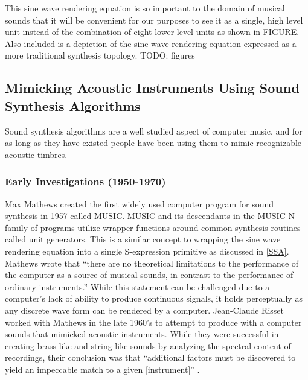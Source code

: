 \documentclass[12pt]{article}
\begin{document}
This sine wave rendering equation is so important to the domain of musical sounds that it will be convenient for our purposes to see it as a single, high level unit instead of the combination of eight lower level units as shown in FIGURE. Also included is a depiction of the sine wave rendering equation expressed as a more traditional synthesis topology. TODO: figures
	
\subsection{Mimicking Acoustic Instruments Using Sound Synthesis Algorithms}
Sound synthesis algorithms are a well studied aspect of computer music, and for as long as they have existed people have been using them to mimic recognizable acoustic timbres.

\subsubsection{Early Investigations (1950-1970)}
Max Mathews created the first widely used computer program for sound synthesis in 1957 called MUSIC. MUSIC and its descendants in the MUSIC-N family of programs utilize wrapper functions around common synthesis routines called unit generators. This is a similar concept to wrapping the sine wave rendering equation into a single S-expression primitive as discussed in \ref{SSA}. Mathews wrote that ``there are no theoretical limitations to the performance of the computer as a source of musical sounds, in contrast to the performance of ordinary instruments.'' \citep{mathews01111963} While this statement can be challenged due to a computer's lack of ability to produce continuous signals, it holds perceptually as any discrete wave form can be rendered by a computer. Jean-Claude Risset worked with Mathews in the late 1960's to attempt to produce with a computer sounds that mimicked acoustic instruments. While they were successful in creating brass-like and string-like sounds by analyzing the spectral content of recordings, their conclusion was that ``additional factors must be discovered to yield an impeccable match to a given [instrument]'' \citep{risset1969analysis}.
\end{document}
